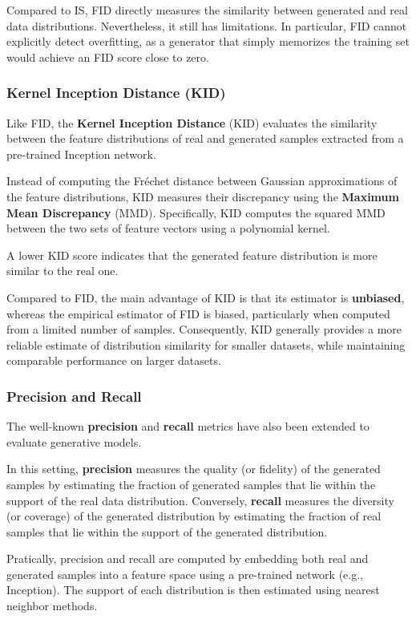 Compared to IS, FID directly measures the similarity between generated and real data distributions. 
Nevertheless, it still has limitations. In particular, FID cannot explicitly detect overfitting, as a generator that simply memorizes the training set would achieve an FID score close to zero.

\subsubsection{Kernel Inception Distance (KID)}

Like FID, the \textbf{Kernel Inception Distance} (KID) evaluates the similarity between the feature distributions of real and generated samples extracted from a pre-trained Inception network.

Instead of computing the Fréchet distance between Gaussian approximations of the feature distributions, KID measures their discrepancy using the \textbf{Maximum Mean Discrepancy} (MMD). 
Specifically, KID computes the squared MMD between the two sets of feature vectors using a polynomial kernel.

A lower KID score indicates that the generated feature distribution is more similar to the real one.

Compared to FID, the main advantage of KID is that its estimator is \textbf{unbiased}, whereas the empirical estimator of FID is biased, particularly when computed from a limited number of samples. 
Consequently, KID generally provides a more reliable estimate of distribution similarity for smaller datasets, while maintaining comparable performance on larger datasets.

\subsubsection{Precision and Recall}

The well-known \textbf{precision} and \textbf{recall} metrics have also been extended to evaluate generative models.

In this setting, \textbf{precision} measures the quality (or fidelity) of the generated samples by estimating the fraction of generated samples that lie within the support of the real data distribution. 
Conversely, \textbf{recall} measures the diversity (or coverage) of the generated distribution by estimating the fraction of real samples that lie within the support of the generated distribution.

Pratically, precision and recall are computed by embedding both real and generated samples into a feature space using a pre-trained network (e.g., Inception).
The support of each distribution is then estimated using nearest neighbor methods.

